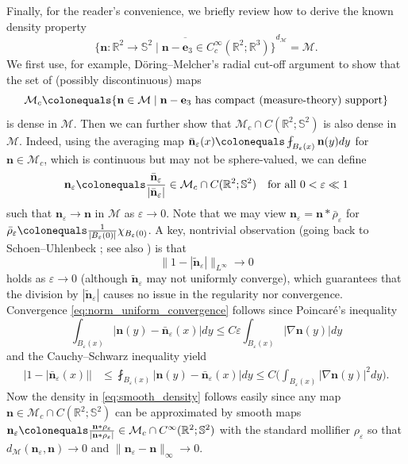 \documentclass{amsart}
\numberwithin{equation}{section}
\theoremstyle{definition}
\theoremstyle{remark}
\newcommand{\R}{\mathbb{R}}
\renewcommand{\S}{\mathbb{S}}
\newcommand{\boM}{\mathcal{M}}
\newcommand{\bn}{{\mathbf{n}}}
\newcommand{\boe}{{\mathbf{e}}}
\begin{document}
Finally, for the reader's convenience, we briefly review how to derive the known density property
\begin{equation}\label{eq:smooth_density}
    \overline{\{ \bn: \R^2\to\S^2 \mid \bn-\boe_3 \in C_c^\infty(\R^2;\R^3)  \}}^{d_\boM} = \boM.
\end{equation}
We first use, for example, D\"oring--Melcher's radial cut-off argument \cite[Appendix 1]{MR3639614} to show that the set of (possibly discontinuous) maps 
\[
\boM_c\colonequals \{ \bn\in\boM \mid \text{$\bn-\boe_3$ has compact (measure-theory) support} \}
\]
is dense in $\boM$.
Then we can further show that $\boM_c\cap C(\R^2;\S^2)$ is also dense in $\boM$.
Indeed, using the averaging map $\bar\bn_\varepsilon(x)\colonequals \fint_{B_\varepsilon(x)}\bn(y)dy$ for $\bn\in\boM_c$, which is continuous but may not be sphere-valued, we can define
\[
\bn_\varepsilon\colonequals \frac{\bar\bn_\varepsilon}{|\bar\bn_\varepsilon|} \in \boM_c\cap C(\R^2;\S^2) \quad\text{for all $0<\varepsilon\ll1$}
\]
such that $\bn_\varepsilon\to \bn$ in $\boM$ as $\varepsilon\to0$.
Note that we may view $\bn_\varepsilon=\bn*\bar{\rho}_\varepsilon$ for $\bar{\rho}_\varepsilon\colonequals \frac1{|B_\varepsilon(0)|}\chi_{B_\varepsilon(0)}$.
A key, nontrivial observation (going back to Schoen--Uhlenbeck \cite[Proposition 4]{MR710054}; see also \cite[Lemma A.1]{MR728866}) is that
\begin{equation}\label{eq:norm_uniform_convergence}
    \|1-|\tilde{\bn}_\varepsilon|\|_{L^\infty} \to 0
\end{equation}
holds as $\varepsilon\to0$ (although $\tilde{\bn}_\varepsilon$ may not uniformly converge), which guarantees that the division by $|\tilde{\bn}_\varepsilon|$ causes no issue in the regularity nor convergence.
Convergence \eqref{eq:norm_uniform_convergence} follows since Poincar\'e's inequality
\[
\int_{B_{\varepsilon}(x)} |\bn(y)-\bar{\bn}_\varepsilon(x)|dy \leq C\varepsilon\int_{B_{\varepsilon}(x)}|\nabla\bn(y)|dy
\]
and the Cauchy--Schwarz inequality yield
\begin{align*}
    |1-|\bar{\bn}_\varepsilon(x)|| &\leq \fint_{B_{\varepsilon}(x)} |\bn(y)-\bar{\bn}_\varepsilon(x)|dy \leq C \Big( \int_{B_\varepsilon(x)}|\nabla\bn(y)|^2dy \Big).
\end{align*}
Now the density in \eqref{eq:smooth_density} follows easily since any map $\bn\in\boM_c\cap C(\R^2;\S^2)$ can be approximated by smooth maps $\bn_\varepsilon\colonequals \frac{\bn*\rho_\varepsilon}{|\bn*\rho_\varepsilon|}\in \boM_c\cap C^\infty(\R^2;\S^2)$ with the standard mollifier $\rho_\varepsilon$ so that $d_\boM(\bn_\varepsilon,\bn)\to0$ and $\|\bn_\varepsilon-\bn\|_\infty\to0$.
\end{document}
